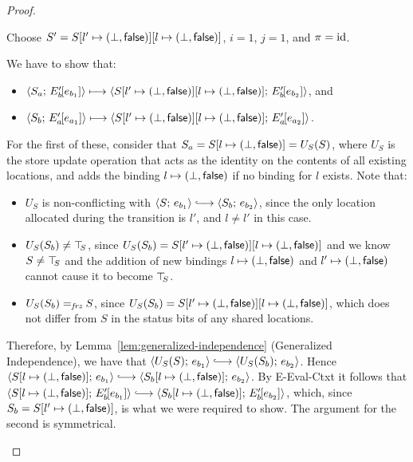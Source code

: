 \begin{proof}
\begin{enumerate}
\begin{enumerate}
\begin{itemize}
          Choose $S' =
          S[l' \mapsto (\bot, \textsf{false})][l \mapsto (\bot, \textsf{false})]$,
          $i = 1$, $j = 1$, and $\pi = \mathrm{id}$.

          We have to show that:
          \begin{itemize}
          \item
            $\langle S_a;\, E'_b\hspace{-1mm}\left[e_{b_1}\right] \rangle \longmapsto
            \langle S[l' \mapsto (\bot, \textsf{false})][l \mapsto (\bot, \textsf{false})];\, E'_b\hspace{-1mm}\left[e_{b_2}\right] \rangle$,
            and
          \item
            $\langle S_b;\, E'_a\hspace{-1mm}\left[e_{a_1}\right] \rangle \longmapsto
            \langle S[l' \mapsto (\bot, \textsf{false})][l \mapsto (\bot, \textsf{false})];\, E'_a\hspace{-1mm}\left[e_{a_2}\right] \rangle$.
          \end{itemize}

          For the first of these, consider that $S_a =
          S[l \mapsto (\bot, \textsf{false})] = U_S(S)$, where $U_S$ is
          the store update operation that acts as the identity on the
          contents of all existing locations, and adds the binding
          $l \mapsto (\bot, \textsf{false})$ if no binding for $l$
          exists.  Note that:
          \begin{itemize}
          \item $U_S$ is non-conflicting with $\config{S}{e_{b_1}}
            \parstepsto \config{S_b}{e_{b_2}}$, since the only
            location allocated during the transition is $l'$, and $l
            \neq l'$ in this case.
          \item $U_S(S_b) \neq \top\hspace{-0.85mm}_{S}$, since $U_S(S_b) =
            S[l' \mapsto (\bot, \textsf{false})][l \mapsto (\bot, \textsf{false})]$
            and we know $S \neq \top\hspace{-0.85mm}_{S}$ and the addition of new
            bindings $l \mapsto (\bot, \textsf{false})$ and
            $l' \mapsto (\bot, \textsf{false})$ cannot cause it to
            become $\top\hspace{-0.85mm}_{S}$.
          \item $U_S(S_b) =_{\textit{frz}} S$, since $U_S(S_b) =
            S[l' \mapsto (\bot, \textsf{false})][l \mapsto (\bot, \textsf{false})]$,
            which does not differ from $S$ in the status bits of any
            shared locations.
          \end{itemize}

          Therefore, by Lemma~\ref{lem:generalized-independence}
          (Generalized Independence), we have that
          $\config{U_S(S)}{e_{b_1}} \parstepsto
          \config{U_S(S_b)}{e_{b_2}}$.  Hence
          $\config{\extS{S}{l}{\bot}{\frozenfalse}}{e_{b_1}}
          \parstepsto
          \config{\extS{S_b}{l}{\bot}{\frozenfalse}}{e_{b_2}}$.  By
                 {\sc E-Eval-Ctxt} it follows that
                 $\config{\extS{S}{l}{\bot}{\frozenfalse}}{\evalctxt{E'_b}{e_{b_1}}}
                 \parstepsto
                 \config{\extS{S_b}{l}{\bot}{\frozenfalse}}{\evalctxt{E'_b}{e_{b_2}}}$,
                 which, since $S_b =
                 S[l' \mapsto (\bot, \textsf{false})]$, is what we were
                 required to show.  The argument for the second is
                 symmetrical.


\end{itemize}
\end{enumerate}
\end{enumerate}
\end{proof}
